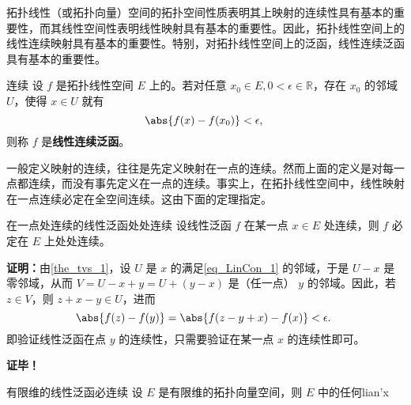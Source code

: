 
拓扑线性（或拓扑向量）空间的拓扑空间性质表明其上映射的连续性具有基本的重要性，而其线性空间性表明线性映射具有基本的重要性。因此，拓扑线性空间上的线性连续映射具有基本的重要性。特别，对拓扑线性空间上的泛函，线性连续泛函具有基本的重要性。
\begin{definition}{连续}
设 $f$ 是拓扑线性空间 $E$ 上的。若对任意 $x_0\in E,0<\epsilon\in\mathbb R$，存在 $x_0$ 的邻域 $U$，使得 $x\in U$ 就有
\begin{equation}\label{eq_LinCon_1}
\abs{f(x)-f(x_0)}<\epsilon,~
\end{equation}
则称 $f$ 是\textbf{线性连续泛函}。
\end{definition}

一般定义映射的连续，往往是先定义映射在一点的连续。然而上面的定义是对每一点都连续，而没有事先定义在一点的连续。事实上，在拓扑线性空间中，线性映射在一点连续必定在全空间连续。这由下面的定理指定。
\begin{theorem}{在一点处连续的线性泛函处处连续}
设线性泛函 $f$ 在某一点 $x\in E$ 处连续，则 $f$ 必定在 $E$ 上处处连续。
\end{theorem}
\textbf{证明：}由\autoref{the_tvs_1}，设 $U$ 是 $x$ 的满足\autoref{eq_LinCon_1} 的邻域，于是 $U-x$ 是零邻域，从而 $V=U-x+y=U+(y-x)$ 是（任一点） $y$ 的邻域。因此，若 $z\in V$，则 $z+x-y\in U$，进而
\begin{equation}
\abs{f(z)-f(y)}=\abs{f(z-y+x)-f(x)}<\epsilon.~
\end{equation}
即验证线性泛函在点 $y$ 的连续性，只需要验证在某一点 $x$ 的连续性即可。

\textbf{证毕！}

\begin{theorem}{有限维的线性泛函必连续}
设 $E$ 是有限维的拓扑向量空间，则 $E$ 中的任何lian'x
\end{theorem}




